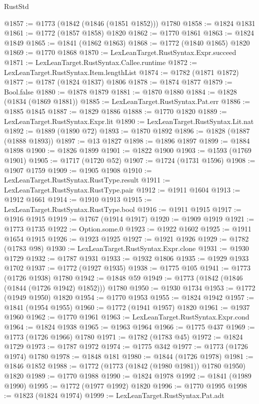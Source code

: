 \begin{lexlean}{RustStd}
\begin{coremodule}
@1857 := @1773 (@1842 (@1846 (@1851 @1852))) @1780
@1858 := @1824 @1831
@1861 := @1772 (@1857 @1858) @1820
@1862 := @1770 @1861
@1863 := @1824 @1849
@1865 := @1841 (@1862 @1863)
@1868 := @1772 (@1840 @1865) @1820
@1869 := @1770 @1868
@1870 := LexLeanTarget.RustSyntax.Expr.succeed
@1871 := LexLeanTarget.RustSyntax.Callee.runtime
@1872 := LexLeanTarget.RustSyntax.Item.lengthList
@1874 := @1782 (@1871 @1872)
@1877 := @1787 (@1824 @1837) @1806
@1878 := @1874 @1877
@1879 := Bool.false
@1880 := @1878 @1879
@1881 := @1870 @1880
@1884 := @1828 (@1834 (@1869 @1881))
@1885 := LexLeanTarget.RustSyntax.Pat.err
@1886 := @1885 @1845
@1887 := @1829 @1886
@1888 := @1770 @1820
@1889 := LexLeanTarget.RustSyntax.Expr.lit
@1890 := LexLeanTarget.RustSyntax.Lit.nat
@1892 := @1889 (@1890 @72)
@1893 := @1870 @1892
@1896 := @1828 (@1887 (@1888 @1893))
@1897 := @13 @1827
@1898 := @1896 @1897
@1899 := @1884 @1898
@1900 := @1826 @1899
@1901 := @1822 @1900
@1903 := @1593 (@1769 @1901)
@1905 := @1717 (@1720 @52)
@1907 := @1724 (@1731 @1596)
@1908 := @1907 @1759
@1909 := @1905 @1908
@1910 := LexLeanTarget.RustSyntax.RustType.result
@1911 := LexLeanTarget.RustSyntax.RustType.pair
@1912 := @1911 @1604
@1913 := @1912 @1661
@1914 := @1910 @1913
@1915 := LexLeanTarget.RustSyntax.RustType.bool
@1916 := @1911 @1915
@1917 := @1916 @1915
@1919 := @1767 (@1914 @1917)
@1920 := @1909 @1919
@1921 := @1773 @1735
@1922 := Option.some.{0}
@1923 := @1922 @1602
@1925 := @1911 @1654 @1915
@1926 := @1923 @1925
@1927 := @1921 @1926
@1929 := @1782 (@1783 @98)
@1930 := LexLeanTarget.RustSyntax.Expr.clone
@1931 := @1930 @1729
@1932 := @1787 @1931
@1933 := @1932 @1806
@1935 := @1929 @1933 @1702
@1937 := @1772 (@1927 @1935)
@1938 := @1775 @105
@1941 := @1773 (@1726 @1938) @1780
@1942 := @1848 @59
@1949 := @1773 (@1842 (@1846 (@1844 (@1726 @1942) @1852))) @1780
@1950 := @1930 @1734
@1953 := @1772 (@1949 @1950) @1820
@1954 := @1770 @1953
@1955 := @1824 @1942
@1957 := @1841 (@1954 @1955)
@1960 := @1772 (@1941 @1957) @1820
@1961 := @1937 @1960
@1962 := @1770 @1961
@1963 := LexLeanTarget.RustSyntax.Expr.cond
@1964 := @1824 @1938
@1965 := @1963 @1964
@1966 := @1775 @437
@1969 := @1773 (@1726 @1966) @1780
@1971 := @1782 (@1783 @45)
@1972 := @1824 @1729
@1973 := @1787 @1972
@1974 := @1775 @342
@1977 := @1773 (@1726 @1974) @1780
@1978 := @1848 @181
@1980 := @1844 (@1726 @1978)
@1981 := @1846 @1852
@1988 := @1772 (@1773 (@1842 (@1980 @1981)) @1780 @1950) @1820
@1989 := @1770 @1988
@1990 := @1824 @1978
@1992 := @1841 (@1989 @1990)
@1995 := @1772 (@1977 @1992) @1820
@1996 := @1770 @1995
@1998 := @1823 (@1824 @1974)
@1999 := LexLeanTarget.RustSyntax.Pat.adt

\end{coremodule}
\end{lexlean}
